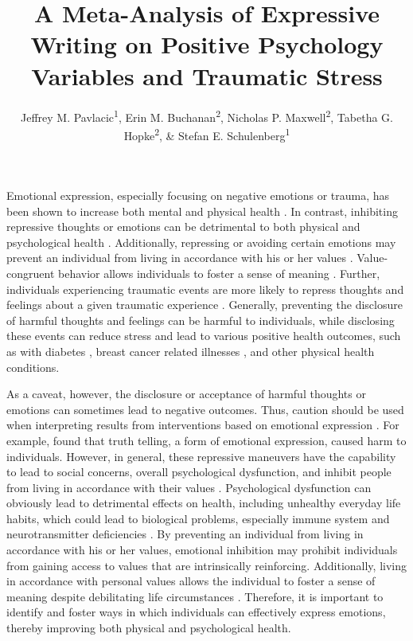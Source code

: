 \documentclass[english,man]{apa6}
\title{A Meta-Analysis of Expressive Writing on Positive Psychology Variables
and Traumatic Stress}
\author{Jeffrey M. Pavlacic\textsuperscript{1}, Erin M. Buchanan\textsuperscript{2}, Nicholas P. Maxwell\textsuperscript{2}, Tabetha G. Hopke\textsuperscript{2}, \& Stefan E. Schulenberg\textsuperscript{1}}
\affiliation{
    \vspace{0.5cm}
          \textsuperscript{1} University of Mississippi\\
          \textsuperscript{2} Missouri State University  }
\theoremstyle{definition}
\theoremstyle{definition}
\theoremstyle{definition}
\theoremstyle{remark}
\begin{document}
\maketitle

\setcounter{secnumdepth}{0}



Emotional expression, especially focusing on negative emotions or
trauma, has been shown to increase both mental and physical health
\autocites{Rachman1980}{Scheff1979}{Esterling1990}{Fawzy1993}{Lieberman2006}.
In contrast, inhibiting repressive thoughts or emotions can be
detrimental to both physical and psychological health
\autocites{Gross1997}{Goldstein1988}{Larson1990a}. Additionally,
repressing or avoiding certain emotions may prevent an individual from
living in accordance with his or her values \autocite{Wilson2009}.
Value-congruent behavior allows individuals to foster a sense of meaning
\autocites{Frankl1959}{Schulenberg2008}. Further, individuals
experiencing traumatic events are more likely to repress thoughts and
feelings about a given traumatic experience \autocite{Bodor2002}.
Generally, preventing the disclosure of harmful thoughts and feelings
can be harmful to individuals, while disclosing these events can reduce
stress and lead to various positive health outcomes, such as with
diabetes \autocite{Bodor2002}, breast cancer related illnesses
\autocite{Stanton2002}, and other physical health conditions.

As a caveat, however, the disclosure or acceptance of harmful thoughts
or emotions can sometimes lead to negative outcomes. Thus, caution
should be used when interpreting results from interventions based on
emotional expression \autocite{Wilson2009}. For example,
\textcite{Brouneus2010} found that truth telling, a form of emotional
expression, caused harm to individuals. However, in general, these
repressive maneuvers have the capability to lead to social concerns,
overall psychological dysfunction, and inhibit people from living in
accordance with their values
\autocites{Frankl1959}{Pennebaker1989}{Pennebaker1986}{Schulenberg2008}{Wilson2009}.
Psychological dysfunction can obviously lead to detrimental effects on
health, including unhealthy everyday life habits, which could lead to
biological problems, especially immune system and neurotransmitter
deficiencies \autocite{Pennebaker1986}. By preventing an individual from
living in accordance with his or her values, emotional inhibition may
prohibit individuals from gaining access to values that are
intrinsically reinforcing. Additionally, living in accordance with
personal values allows the individual to foster a sense of meaning
despite debilitating life circumstances
\autocites{Frankl1959}{Schulenberg2008}. Therefore, it is important to
identify and foster ways in which individuals can effectively express
emotions, thereby improving both physical and psychological health.
\end{document}

